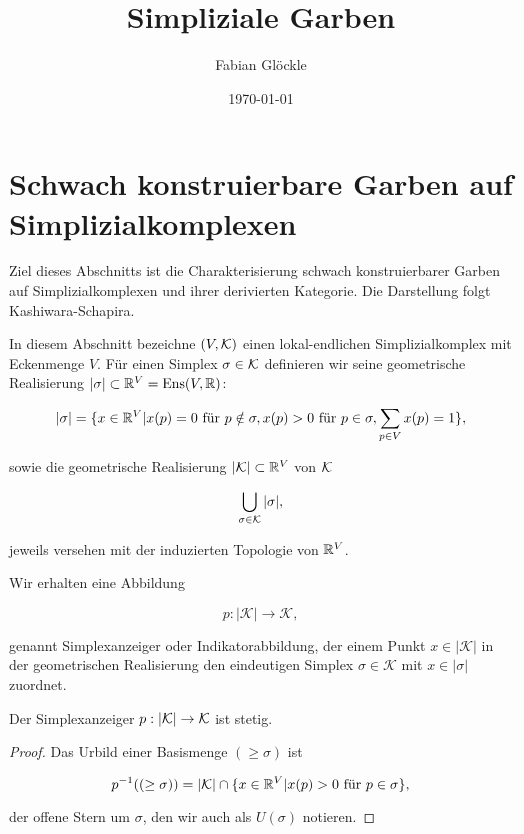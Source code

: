 



\title{Simpliziale Garben}
\author{Fabian Glöckle}
\date{\today}

\section{Schwach konstruierbare Garben auf Simplizialkomplexen}

Ziel dieses Abschnitts ist die Charakterisierung schwach
konstruierbarer Garben auf Simplizialkomplexen und ihrer derivierten
Kategorie. Die Darstellung folgt Kashiwara-Schapira.

In diesem Abschnitt bezeichne $(V, \mathcal{K})$ einen lokal-endlichen
Simplizialkomplex mit Eckenmenge $V$. Für einen Simplex $\sigma \in
\mathcal{K}$ definieren wir seine geometrische Realisierung $|\sigma| \subset
\mathbb{R}^V = \operatorname{Ens}(V, \mathbb{R})$:

\[ |\sigma| = \{ x \in \mathbb{R}^V | x(p) = 0 \text{ für } p \notin \sigma,
x(p) > 0 \text{ für } p \in \sigma,
\sum_{p \in V} x(p) = 1 \}, \]

sowie die geometrische Realisierung $|\mathcal{K}| \subset \mathbb{R}^V$ von $\mathcal{K}$

\[ \bigcup_{\sigma \in \mathcal{K}} |\sigma|, \]

jeweils versehen mit der induzierten Topologie von $\mathbb{R}^V$.

Wir erhalten eine Abbildung

\[ p: |\mathcal{K}| \to \mathcal{K}, \]

genannt Simplexanzeiger oder Indikatorabbildung, der einem Punkt $x
\in |\mathcal{K}|$ in der geometrischen Realisierung den eindeutigen
Simplex $\sigma \in \mathcal{K}$ mit $x \in |\sigma|$ zuordnet.

\begin{lemma}
  Der Simplexanzeiger $p: |\mathcal{K}| \to \mathcal{K}$ ist stetig.
\end{lemma}
\begin{proof}
  Das Urbild einer Basismenge $(\geq \sigma)$ ist

  \[ p^{-1}((\geq \sigma)) = |\mathcal{K}| \cap \{x \in \mathbb{R}^V | x(p) > 0 \text{ für }
  p \in \sigma \}, \]

  der offene Stern um $\sigma$, den wir auch als $U(\sigma)$ notieren.
\end{proof}

